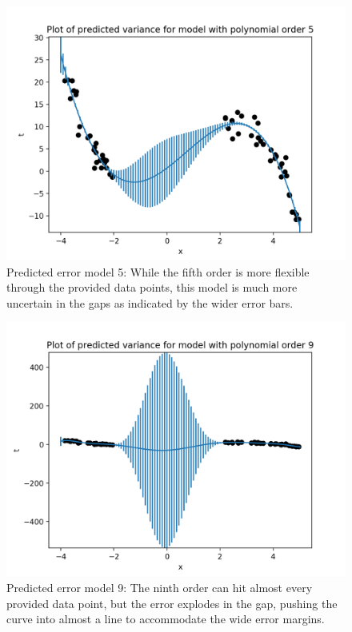 \documentclass[10pt]{article}
\begin{document}
\begin{itemize}
\begin{figure}[H]
\centering
  \includegraphics[width=\linewidth]{error-5.png}
 \caption{Predicted error model 5: While the fifth order is more flexible through the provided data points, this model is much more uncertain in the gaps as indicated by the wider error bars.}
\label{label}
\end{figure}

\begin{figure}[H]
\centering
  \includegraphics[width=\linewidth]{error-9.png}
 \caption{Predicted error model 9: The ninth order can hit almost every provided data point, but the error explodes in the gap, pushing the curve into almost a line to accommodate the wide error margins.}
\label{label}
\end{figure}


\end{itemize}
\end{document}
